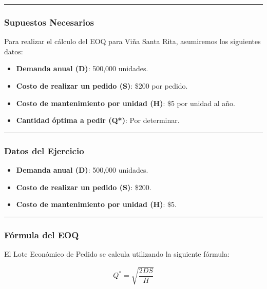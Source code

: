\documentclass[
  letterpaper,
  DIV=11,
  numbers=noendperiod]{scrartcl}
\providecommand{\tightlist}{%
  \setlength{\itemsep}{0pt}\setlength{\parskip}{0pt}}\usepackage{longtable,booktabs,array}
\begin{document}
\begin{center}\rule{0.5\linewidth}{0.5pt}\end{center}

\subsubsection{Supuestos Necesarios}\label{supuestos-necesarios}

Para realizar el cálculo del EOQ para Viña Santa Rita, asumiremos los
siguientes datos:

\begin{itemize}
\tightlist
\item
  \textbf{Demanda anual (D)}: 500,000 unidades.
\item
  \textbf{Costo de realizar un pedido (S)}: \$200 por pedido.
\item
  \textbf{Costo de mantenimiento por unidad (H)}: \$5 por unidad al año.
\item
  \textbf{Cantidad óptima a pedir (Q*)}: Por determinar.
\end{itemize}

\begin{center}\rule{0.5\linewidth}{0.5pt}\end{center}

\subsubsection{Datos del Ejercicio}\label{datos-del-ejercicio-1}

\begin{itemize}
\tightlist
\item
  \textbf{Demanda anual (D)}: 500,000 unidades.
\item
  \textbf{Costo de realizar un pedido (S)}: \$200.
\item
  \textbf{Costo de mantenimiento por unidad (H)}: \$5.
\end{itemize}

\begin{center}\rule{0.5\linewidth}{0.5pt}\end{center}

\subsubsection{Fórmula del EOQ}\label{fuxf3rmula-del-eoq}

El Lote Económico de Pedido se calcula utilizando la siguiente fórmula:

\[
Q^* = \sqrt{\dfrac{2DS}{H}}
\]
\end{document}
